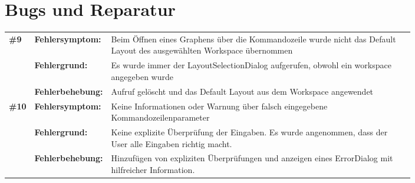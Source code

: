 \chapter{Bugs und Reparatur}
\label{ch:bugsundreparatur}

\newcommand{\bug}[4]{\textbf{\##1} & \textbf{Fehlersymptom:} & #2 \\ & \textbf{Fehlergrund:} & #3 \\ & \textbf{Fehlerbehebung:} & #4 \\ [1ex] }


\begin{longtable}{llp{0.8\linewidth}}

\bug{9}
       {Beim Öffnen eines Graphens über die Kommandozeile wurde nicht das Default Layout des ausgewählten Workspace übernommen}
       {Es wurde immer der LayoutSelectionDialog aufgerufen, obwohl ein workspace angegeben wurde}
       {Aufruf gelöscht und das Default Layout aus dem Workspace angewendet}

\bug{10}
       {Keine Informationen oder Warnung über falsch eingegebene Kommandozeilenparameter}
       {Keine explizite Überprüfung der Eingaben. Es wurde angenommen, dass der User alle Eingaben richtig macht.}
       {Hinzufügen von expliziten Überprüfungen und anzeigen eines ErrorDialog mit hilfreicher Information.}
		
\end{longtable}